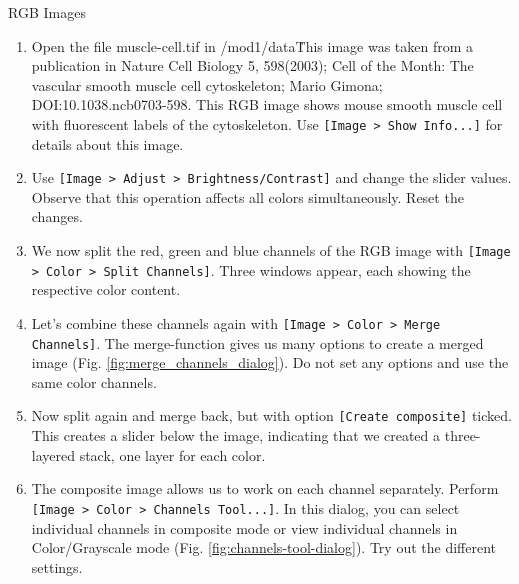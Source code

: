\newpage
\begin{taskbox}{RGB Images}

\begin{enumerate}
	\item Open the file muscle-cell.tif in /mod1/data\. This image was taken from a publication in Nature Cell Biology 5, 598(2003); Cell of the Month: The vascular smooth muscle cell cytoskeleton; Mario Gimona; DOI:10.1038.ncb0703-598. This RGB image shows mouse smooth muscle cell with fluorescent labels of the cytoskeleton. Use \texttt{[Image > Show Info...]} for details about this image.
	\item Use \texttt{[Image > Adjust > Brightness/Contrast]} and change the slider values. Observe that this operation affects all colors simultaneously. Reset the changes.
	\item We now split the red, green and blue channels of the RGB image with \texttt{[Image > Color > Split Channels]}. Three windows appear, each showing the respective color content. 
	\item Let's combine these channels again with \texttt{[Image > Color > Merge Channels]}. The merge-function gives us many options to create a merged image (Fig. \ref{fig:merge_channels_dialog}). Do not set any options and use the same color channels.
	
	\begin{minipage}[t]{\linewidth}
		\begin{center}
		\medskip
		\label{fig:merge-channels-dialog}
		\end{center}
	\end{minipage}
	
	\item Now split again and merge back, but with option \texttt{[Create composite]} ticked. This creates a slider below the image, indicating that we created a three-layered stack, one layer for each color.  
	\item The composite image allows us to work on each channel separately. Perform \texttt{[Image > Color > Channels Tool...]}. In this dialog, you can select individual channels in composite mode or view individual channels in Color/Grayscale mode (Fig. \ref{fig:channels-tool-dialog}). Try out the different settings.
	

\end{enumerate}
\end{taskbox}
